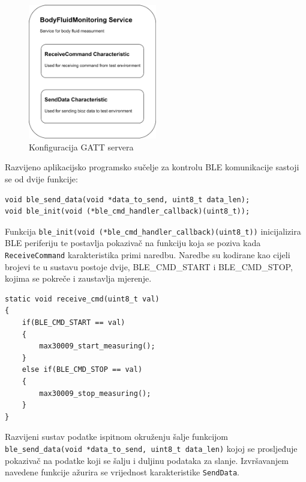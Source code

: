 \documentclass[../diplomski_rad.tex]{subfiles}
\begin{document}
\begin{figure}[htb]
    \centering
    \includegraphics[width=0.5\textwidth]{Figures/ble_service.png} 
    \caption{Konfiguracija GATT servera}
    \label{slk:max_30009_clock}
\end{figure}

Razvijeno aplikacijsko programsko sučelje za kontrolu BLE komunikacije sastoji se od dvije funkcije:
\begin{lstlisting}[label={lst:ble_api},style=CStyle,caption={Programsko sučelje za kontrolu BLE komunikacije},captionpos=b]
void ble_send_data(void *data_to_send, uint8_t data_len);
void ble_init(void (*ble_cmd_handler_callback)(uint8_t));
\end{lstlisting} 

Funkcija \texttt{ble\_init(void (*ble\_cmd\_handler\_callback)(uint8\_t))} inicijalizira BLE periferiju te 
postavlja pokazivač na funkciju koja se poziva kada  \texttt{ReceiveCommand} karakteristika primi naredbu. 
Naredbe su kodirane kao cijeli brojevi te u sustavu postoje dvije, BLE\_CMD\_START i BLE\_CMD\_STOP, kojima se pokreče i zaustavlja mjerenje.  
\begin{lstlisting}[label={lst:ble_received_cmd},style=CStyle,caption={Funkcija koja se poziva kada je primljena naredba},captionpos=b]
static void receive_cmd(uint8_t val)
{
    if(BLE_CMD_START == val)
    {
        max30009_start_measuring();
    }
    else if(BLE_CMD_STOP == val)
    {
        max30009_stop_measuring();
    }
}
\end{lstlisting} 

Razvijeni sustav podatke ispitnom okruženju šalje funkcijom \texttt{ble\_send\_data(void *data\_to\_send, uint8\_t data\_len)} 
kojoj se prosljeđuje pokazivač na podatke koji se šalju i duljinu podataka za slanje. 
Izvršavanjem navedene funkcije ažurira se vrijednost karakteristike \texttt{SendData}.
\end{document}
